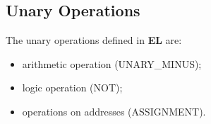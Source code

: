 \subsection*{Unary Operations}

The unary operations defined in \textbf{EL} are:

\begin{itemize}

	\item arithmetic operation (UNARY\_MINUS);
	
	\item logic operation (NOT);
	
	\item operations on addresses (ASSIGNMENT).
	
\end{itemize}


